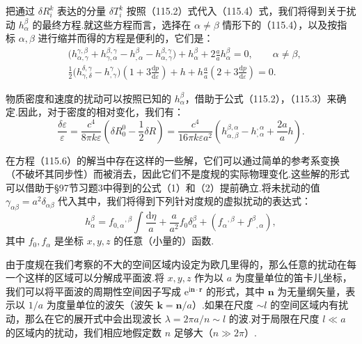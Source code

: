 把通过 $\delta R_{i}^{k}$ 表达的分量 $\delta T_{i}^{k}$ 按照（115.2）式代入（115.4）式，我们将得到关于扰动 $h_{\alpha}^{\beta}$ 的最终方程.就这些方程而言，选择在 $\alpha\neq\beta$ 情形下的（115.4），以及按指标 $\alpha,\beta$ 进行缩并而得的方程是便利的，它们是：
\begin{equation}
  \begin{aligned}
    &\bigl(h_{\alpha,\gamma}^{\gamma,\beta}
    +h_{\gamma,\alpha}^{\beta,\gamma}
    -h_{,\alpha}^{\beta}
    -h_{\alpha,\gamma}^{\beta,\gamma}\bigr)
    +h_{\alpha}^{\beta}
    +2\frac{a}{a}h_{\alpha}^{\beta}=0,\qquad\alpha\neq\beta,\\
    &\frac{1}{2}\bigl(h_{\gamma,\delta}^{\delta,\gamma}
    -h_{,\gamma}^{\gamma}\bigr)
    \left(1+3\frac{\mathrm{d}p}{\mathrm{d}\varepsilon}\right)
    +h+h\frac{a}{a}
    \left(2+3\frac{\mathrm{d}p}{\mathrm{d}\varepsilon}\right)=0.
  \end{aligned}
\end{equation}

物质密度和速度的扰动可以按照已知的 $h_{\alpha}^{\beta}$，借助于公式（115.2），（115.3）来确定.因此，对于密度的相对变化，我们有：
\begin{equation}
  \frac{\delta\varepsilon}{\varepsilon}
  =\frac{c^{4}}{8\pi k\varepsilon}
  \left(\delta R_{0}^{0}-\frac{1}{2}\delta R\right)
  =\frac{c^{4}}{16\pi k\varepsilon a^{2}}
  \left(h_{\alpha,\beta}^{\beta,\alpha}
  -h_{,\alpha}^{,\alpha}
  +\frac{2a}{a}h\right).
\end{equation}

在方程（115.6）的解当中存在这样的一些解，它们可以通过简单的参考系变换（不破坏其同步性）而被消去，因此它们不是度规的实际物理变化.这些解的形式可以借助于§97节习题3中得到的公式（1）和（2）提前确立.将未扰动的值 $\gamma_{\alpha\beta}=a^{2}\delta_{\alpha\beta}$ 代入其中，我们将得到下列针对度规的虚拟扰动的表达式：
\begin{equation}
  h_{\alpha}^{\beta}
  =f_{0,\alpha}{}^{,\beta}\int\frac{\mathrm{d}\eta}{a}
  +\frac{a}{a^{2}}f_{0}\delta_{\alpha}^{\beta}
  +(f_{\alpha}{}^{,\beta}+f^{\beta}{}_{,\alpha}),
\end{equation}
其中 $f_{0},f_{\alpha}$ 是坐标 $x,y,z$ 的任意（小量的）函数.

由于度规在我们考察的不大的空间区域内设定为欧几里得的，那么任意的扰动在每一个这样的区域可以分解成平面波.将 $x,y,z$ 作为以 $a$ 为度量单位的笛卡儿坐标，我们可以将平面波的周期性空间因子写成 $\mathrm{e}^{\mathrm{i}\boldsymbol{n}\cdot\boldsymbol{r}}$ 的形式，其中 $\boldsymbol{n}$ 为无量纲矢量，表示以 $1/a$ 为度量单位的波矢（波矢 $\boldsymbol{k}=\boldsymbol{n}/a$）.如果在尺度 $\sim l$ 的空间区域内有扰动，那么在它的展开式中会出现波长 $\lambda=2\pi a/n\sim l$ 的波.对于局限在尺度 $l\ll a$ 的区域内的扰动，我们相应地假定数 $n$ 足够大（$n\gg2\pi$）.

